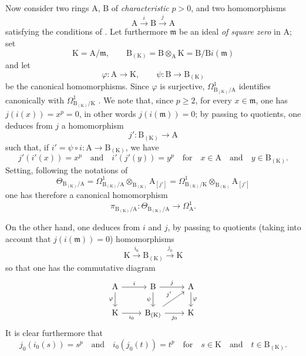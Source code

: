 \begin{env}[22.4.5]
\label{0.22.4.5}
Now consider two rings $\mathrm{A}$, $\mathrm{B}$ of \emph{characteristic} $p>0$, and two homomorphisms
\[
  \mathrm{A}\xrightarrow{i}\mathrm{B}\xrightarrow{j}\mathrm{A}
\]
satisfying the conditions of .
Let furthermore $\mathfrak{m}$ be an ideal \emph{of square zero} in $\mathrm{A}$; set
\[
  \mathrm{K}=\mathrm{A}/\mathfrak{m},\qquad \mathrm{B}_{(\mathrm{K})}=\mathrm{B}\otimes_\mathrm{A}\mathrm{K}=\mathrm{B}/\mathrm{B}i(\mathfrak{m})
\]
and let
\[
  \varphi:\mathrm{A}\to\mathrm{K},\qquad \psi:\mathrm{B}\to\mathrm{B}_{(\mathrm{K})}
\]
be the canonical homomorphisms.
Since $\varphi$ is surjective, $\Omega^1_{\mathrm{B}_{(\mathrm{K})}/\mathrm{A}}$ identifies canonically with $\Omega^1_{\mathrm{B}_{(\mathrm{K})}/\mathrm{K}}$ .
We note that, since $p\geq 2$, for every $x\in\mathfrak{m}$, one has $j(i(x))=x^p=0$, in other words $j(i(\mathfrak{m}))=0$; by passing to quotients, one deduces from $j$ a homomorphism
\[
  j':\mathrm{B}_{(\mathrm{K})}\to\mathrm{A}
\]
such that, if $i'=\psi\circ i:\mathrm{A}\to\mathrm{B}_{(\mathrm{K})}$, we have
\[
  j'(i'(x))=x^p \quad\text{and}\quad i'(j'(y))=y^p
  \quad\text{for}\quad x\in\mathrm{A}\quad\text{and}\quad y\in\mathrm{B}_{(\mathrm{K})}.
\]
Setting, following the notations of 
\[
  \Theta_{\mathrm{B}_{(\mathrm{K})}/\mathrm{A}}=\Omega^1_{\mathrm{B}_{(\mathrm{K})}/\mathrm{A}}\otimes_{\mathrm{B}_{(\mathrm{K})}}\mathrm{A}_{[j']}=\Omega^1_{\mathrm{B}_{(\mathrm{K})}/\mathrm{K}}\otimes_{\mathrm{B}_{(\mathrm{K})}}\mathrm{A}_{[j']}
\]
one has therefore  a canonical homomorphism
\[
\label{0.22.4.5.1}
  \pi_{\mathrm{B}_{(\mathrm{K})}/\mathrm{A}}:\Theta_{\mathrm{B}_{(\mathrm{K})}/\mathrm{A}}\to\Omega^1_\mathrm{A}.
  \tag{22.4.5.1}
\]

On the other hand, one deduces from $i$ and $j$, by passing to quotients (taking into account that $j(i(\mathfrak{m}))=0$) homomorphisms
\[
  \mathrm{K}\xrightarrow{i_0}\mathrm{B}_{(\mathrm{K})}\xrightarrow{j_0}\mathrm{K}
\]
so that one has the commutative diagram
\[
  \begin{tikzcd}
    \mathrm{A} \ar[r,"i"] \ar[d,"\varphi"'] & \mathrm{B} \ar[r,"j"] \ar[d,"\psi"'] & \mathrm{A} \ar[d,"\varphi"]\\
    \mathrm{K} \ar[r,"i_0"'] & \mathrm{B}_{(\mathrm{K})} \ar[r,"j_0"'] \ar[ur,"j'"] & \mathrm{K}
  \end{tikzcd}
\]
It is clear furthermore that
\[
  j_0(i_0(s))=s^p \quad\text{and}\quad i_0(j_0(t))=t^p
  \quad\text{for}\quad s\in\mathrm{K}\quad\text{and}\quad t\in\mathrm{B}_{(\mathrm{K})}.
\]


\end{env}
